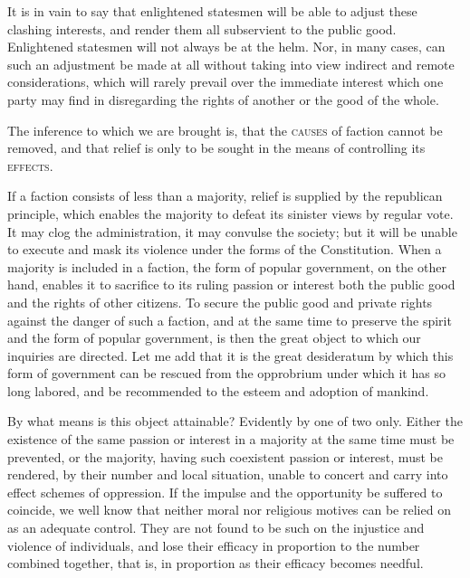It is in vain to say that enlightened statesmen will be able to adjust these clashing interests, and render them all subservient to the public good. Enlightened statesmen will not always be at the helm. Nor, in many cases, can such an adjustment be made at all without taking into view indirect and remote considerations, which will rarely prevail over the immediate interest which one party may find in disregarding the rights of another or the good of the whole.

The inference to which we are brought is, that the \textsc{causes }of faction cannot be removed, and that relief is only to be sought in the means of controlling its \textsc{effects}.

If a faction consists of less than a majority, relief is supplied by the republican principle, which enables the majority to defeat its sinister views by regular vote. It may clog the administration, it may convulse the society; but it will be unable to execute and mask its violence under the forms of the Constitution. When a majority is included in a faction, the form of popular government, on the other hand, enables it to sacrifice to its ruling passion or interest both the public good and the rights of other citizens. To secure the public good and private rights against the danger of such a faction, and at the same time to preserve the spirit and the form of popular government, is then the great object to which our inquiries are directed. Let me add that it is the great desideratum by which this form of government can be rescued from the opprobrium under which it has so long labored, and be recommended to the esteem and adoption of mankind.

By what means is this object attainable? Evidently by one of two only. Either the existence of the same passion or interest in a majority at the same time must be prevented, or the majority, having such coexistent passion or interest, must be rendered, by their number and local situation, unable to concert and carry into effect schemes of oppression. If the impulse and the opportunity be suffered to coincide, we well know that neither moral nor religious motives can be relied on as an adequate control. They are not found to be such on the injustice and violence of individuals, and lose their efficacy in proportion to the number combined together, that is, in proportion as their efficacy becomes needful.

